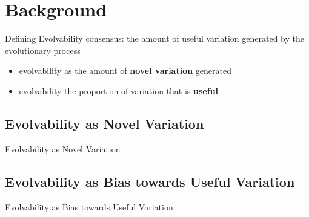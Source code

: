 \section{Background}

\begin{frame}{Defining Evolvability}
consensus: the amount of \textcolor{h2}{useful} \textcolor{h1}{variation} generated by the evolutionary process
\begin{itemize}
  \item evolvability as the amount of \textcolor{h1}{\textbf{novel variation}} generated
  \item evolvability the proportion of variation that is \textcolor{h2}{\textbf{useful}}
\end{itemize}
\end{frame}



\subsection{Evolvability as Novel Variation}

\begin{frame}{Evolvability as Novel Variation}
	
\end{frame}

\subsection{Evolvability as Bias towards Useful Variation}

\begin{frame}{Evolvability as Bias towards Useful Variation}
  
\end{frame}


